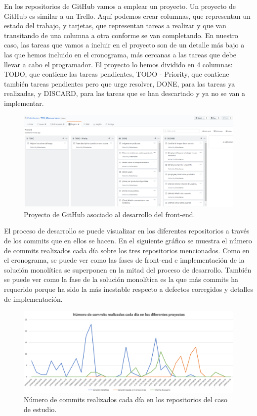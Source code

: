 \documentclass[11pt,spanish,listoffigures]{tfgetsinf}
\begin{document}
En los repositorios de GitHub vamos a emplear un proyecto. Un proyecto de GitHub es similar a un Trello. Aquí podemos crear columnas, que representan un estado del trabajo, y tarjetas, que representan tareas a realizar y que van transitando de una columna a otra conforme se van completando. En nuestro caso, las tareas que vamos a incluir en el proyecto son de un detalle más bajo a las que hemos incluido en el cronograma, más cercanas a las tareas que debe llevar a cabo el programador. El proyecto lo hemos dividido en 4 columnas: TODO, que contiene las tareas pendientes, TODO - Priority, que contiene también tareas pendientes pero que urge resolver, DONE, para las tareas ya realizadas, y DISCARD, para las tareas que se han descartado y ya no se van a implementar.

\begin{figure}[h]
\centering
\includegraphics[scale=0.35]{GitHubProject}
\caption{Proyecto de GitHub asociado al desarrollo del front-end.}
\end{figure}

\newpage


El proceso de desarrollo se puede visualizar en los diferentes repositorios a través de los commits que en ellos se hacen. En el siguiente gráfico se muestra el número de commits realizados cada día sobre los tres repositorios mencionados. Como en el cronograma, se puede ver como las fases de front-end e implementación de la solución monolítica se superponen en la mitad del proceso de desarrollo. También se puede ver como la fase de la solución monolítica es la que más commits ha requerido porque ha sido la más inestable respecto a defectos corregidos y detalles de implementación.

\begin{figure}[h]
\centering
\includegraphics[scale=0.5]{commits}
\caption{Número de commits realizados cada día en los repositorios del caso de estudio.}
\end{figure}
\end{document}
